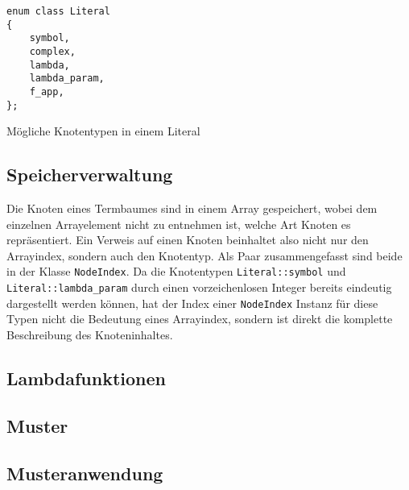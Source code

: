 \documentclass{scrartcl}
\numberwithin{figure}{section} %
\theoremstyle{definition} %
\begin{document}
\begin{listing}
\small
\begin{verbatim}
enum class Literal
{
    symbol,
    complex,
    lambda,
    lambda_param,
    f_app,
};
\end{verbatim}
\label{abbLiteralEnum}
\caption{Mögliche Knotentypen in einem Literal}
\end{listing}

\subsection{Speicherverwaltung} \label{subsecSpeicherverwaltung}

Die Knoten eines Termbaumes sind in einem Array gespeichert, wobei dem einzelnen Arrayelement nicht zu entnehmen ist, welche Art Knoten es repräsentiert. Ein Verweis auf einen Knoten beinhaltet also nicht nur den Arrayindex, sondern auch den Knotentyp. Als Paar zusammengefasst sind beide in der Klasse \texttt{NodeIndex}. 
Da die Knotentypen \texttt{Literal::symbol} und \texttt{Literal::lambda_param} durch einen vorzeichenlosen Integer bereits eindeutig dargestellt werden können, hat der Index einer \texttt{NodeIndex} Instanz für diese Typen nicht die Bedeutung eines Arrayindex, sondern ist direkt die komplette Beschreibung des Knoteninhaltes.

\subsection{Lambdafunktionen} \label{subsecLambdafunktionen}

\subsection{Muster} \label{subsecCppMuster}

\subsection{Musteranwendung} \label{subsecCppMusterAnwendung}
\end{document}
